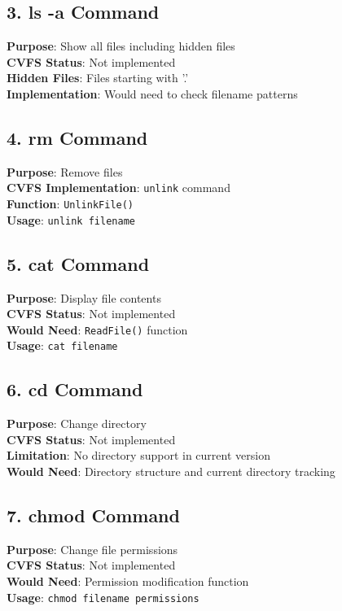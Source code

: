 \documentclass[11pt,a4paper]{article}
\begin{document}
\subsection{3. ls -a Command}
\textbf{Purpose}: Show all files including hidden files\\
\textbf{CVFS Status}: Not implemented\\
\textbf{Hidden Files}: Files starting with '.'\\
\textbf{Implementation}: Would need to check filename patterns

\subsection{4. rm Command}
\textbf{Purpose}: Remove files\\
\textbf{CVFS Implementation}: \texttt{unlink} command\\
\textbf{Function}: \texttt{UnlinkFile()}\\
\textbf{Usage}: \texttt{unlink filename}

\subsection{5. cat Command}
\textbf{Purpose}: Display file contents\\
\textbf{CVFS Status}: Not implemented\\
\textbf{Would Need}: \texttt{ReadFile()} function\\
\textbf{Usage}: \texttt{cat filename}

\subsection{6. cd Command}
\textbf{Purpose}: Change directory\\
\textbf{CVFS Status}: Not implemented\\
\textbf{Limitation}: No directory support in current version\\
\textbf{Would Need}: Directory structure and current directory tracking

\subsection{7. chmod Command}
\textbf{Purpose}: Change file permissions\\
\textbf{CVFS Status}: Not implemented\\
\textbf{Would Need}: Permission modification function\\
\textbf{Usage}: \texttt{chmod filename permissions}
\end{document}
